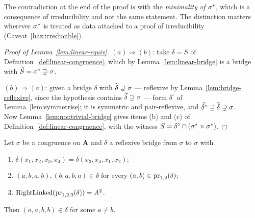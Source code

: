 \begin{hazard}\label{haz:minimality-not-irred}
The contradiction at the end of the proof is with the \emph{minimality of
$\sigma^{*}$}, which is a consequence of irreducibility and not the same
statement. The distinction matters wherever $\sigma^{*}$ is treated as data
attached to a proof of irreducibility (Caveat~\ref{haz:irreducible}).
\end{hazard}

\begin{proof}[Proof of Lemma~\ref{lem:linear-equiv}]
$(a)\Rightarrow(b)$: take $\delta=S$ of Definition~\ref{def:linear-congruence},
which by Lemma~\ref{lem:linear-bridge} is a bridge with
$\widetilde{S}=\sigma^{*}\supsetneq\sigma$.

$(b)\Rightarrow(a)$: given a bridge $\delta$ with
$\widetilde{\delta}\supsetneq\sigma$ --- reflexive by
Lemma~\ref{lem:bridge-reflexive}, since the hypothesis contains
$\widetilde{\delta}\supseteq\sigma$ --- form $\delta^{\circ}$ of
Lemma~\ref{lem:symmetrise}; it is symmetric and pair-reflexive, and
$\widetilde{\delta^{\circ}}\supseteq\widetilde{\delta}\supsetneq\sigma$. Now
Lemma~\ref{lem:nontrivial-bridge} gives items (b) and (c) of
Definition~\ref{def:linear-congruence}, with the witness
$S=\delta^{\circ}\cap(\sigma^{*}\times\sigma^{*})$.
\end{proof}



\begin{longlemma}\label{lem:pc-inductive-step}
Let $\sigma$ be a congruence on $\mathbf A$ and $\delta$ a reflexive bridge
from $\sigma$ to $\sigma$ with
\begin{enumerate}\romanlabels\tightlist
\item $\delta(x_{1},x_{2},x_{3},x_{4})=\delta(x_{3},x_{4},x_{1},x_{2})$;
\item $(a,b,a,b),(b,a,b,a)\in\delta$ for every $(a,b)\in\operatorname*{pr}_{1,2}(\delta)$;
\item $\operatorname{RightLinked}(\operatorname*{pr}_{1,2,3}(\delta))=A^{2}$.
\end{enumerate}
Then $(a,a,b,b)\in\delta$ for some $a\neq b$.
\end{longlemma}

